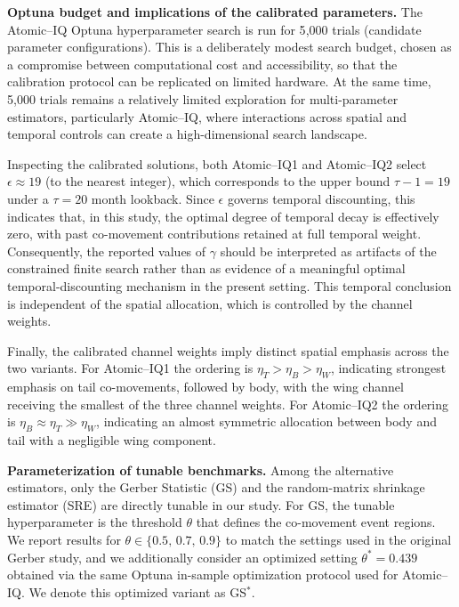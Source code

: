 \documentclass[12pt,letterpaper]{article}
\begin{document}
\noindent\textbf{Optuna budget and implications of the calibrated parameters.}
The Atomic–IQ Optuna hyperparameter search is run for 5{,}000 trials (candidate parameter configurations). This is a deliberately modest search budget, chosen as a compromise between computational cost and accessibility, so that the calibration protocol can be replicated on limited hardware. At the same time, 5{,}000 trials remains a relatively limited exploration for multi-parameter estimators, particularly Atomic--IQ, where interactions across spatial and temporal controls can create a high-dimensional search landscape.

Inspecting the calibrated solutions, both Atomic--IQ1 and Atomic--IQ2 select $\epsilon\approx 19$ (to the nearest integer), which corresponds to the upper bound $\tau-1=19$ under a $\tau=20$ month lookback. Since $\epsilon$ governs temporal discounting, this indicates that, in this study, the optimal degree of temporal decay is effectively zero, with past co-movement contributions retained at full temporal weight. Consequently, the reported values of $\gamma$ should be interpreted as artifacts of the constrained finite search rather than as evidence of a meaningful optimal temporal-discounting mechanism in the present setting. This temporal conclusion is independent of the spatial allocation, which is controlled by the channel weights.

Finally, the calibrated channel weights imply distinct spatial emphasis across the two variants. For Atomic--IQ1 the ordering is $\eta_T > \eta_B > \eta_W$, indicating strongest emphasis on tail co-movements, followed by body, with the wing channel receiving the smallest of the three channel weights. For Atomic--IQ2 the ordering is $\eta_B \approx \eta_T \gg \eta_W$, indicating an almost symmetric allocation between body and tail with a negligible wing component.


\medskip
\noindent\textbf{Parameterization of tunable benchmarks.}
Among the alternative estimators, only the Gerber Statistic (GS) and the random-matrix shrinkage estimator (SRE) are directly tunable in our study. For GS, the tunable hyperparameter is the threshold $\theta$ that defines the co-movement event regions. We report results for $\theta\in\{0.5,\,0.7,\,0.9\}$ to match the settings used in the original Gerber study, and we additionally consider an optimized setting $\theta^{\ast}=0.439$ obtained via the same Optuna in-sample optimization protocol used for Atomic--IQ. We denote this optimized variant as GS$^{\ast}$.
\end{document}
